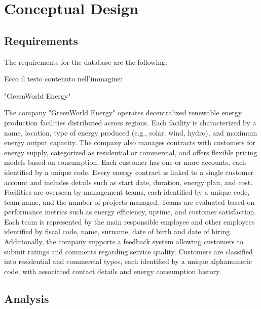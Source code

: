 \section{Conceptual Design}
\subsection{Requirements}
The requirements for the database are the following:

Ecco il testo contenuto nell'immagine:

"GreenWorld Energy"

The company "GreenWorld Energy" operates decentralized renewable energy production facilities distributed across regions. Each facility is characterized by a name, location, type of energy produced (e.g., solar, wind, hydro), and maximum energy output capacity. The company also manages contracts with customers for energy supply, categorized as residential or commercial, and offers flexible pricing models based on consumption.
Each customer has one or more accounts, each identified by a unique code. Every energy contract is linked to a single customer account and includes details such as start date, duration, energy plan, and cost. Facilities are overseen by management teams, each identified by a unique code, team name, and the number of projects managed.
Teams are evaluated based on performance metrics such as energy efficiency, uptime, and customer satisfaction.
Each team is represented by the main responsible employee and other employees identified by fiscal code, name, surname, date of birth and date of hiring. Additionally, the company supports a feedback system allowing customers to submit ratings and comments regarding service quality. Customers are classified into residential and commercial types, each identified by a unique alphanumeric code, with associated contact details and energy consumption history.
\subsection{Analysis}

